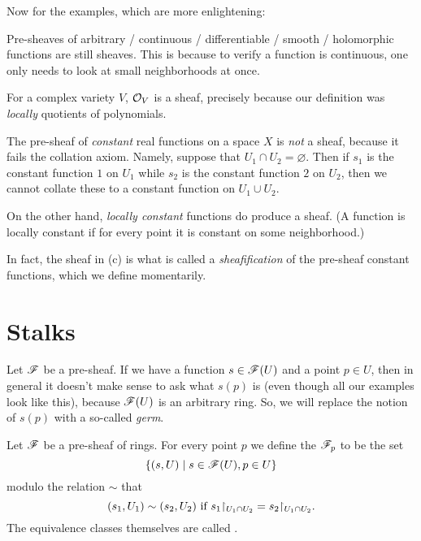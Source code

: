 \documentclass[11pt]{scrreprt}
\begin{document}
Now for the examples, which are more enlightening:
\begin{example}
	\listhack
	\begin{enumerate}[(a)]
		\ii Pre-sheaves of arbitrary / continuous / differentiable / smooth
		/ holomorphic functions are still sheaves.
		This is because to verify a function is continuous,
		one only needs to look at small neighborhoods at once.
		
		\ii For a complex variety $V$, $\mathcal O_V$ is a sheaf,
		precisely because our definition was \emph{locally} quotients
		of polynomials.

		\ii The pre-sheaf of \emph{constant} real functions on a space $X$
		is \emph{not} a sheaf, because it fails the collation axiom.
		Namely, suppose that $U_1 \cap U_2 = \varnothing$.
		Then if $s_1$ is the constant function $1$ on $U_1$
		while $s_2$ is the constant function $2$ on $U_2$,
		then we cannot collate these to a constant function on $U_1 \cup U_2$.

		\ii On the other hand, \emph{locally constant} functions
		do produce a sheaf. (A function is locally constant
		if for every point it is constant on some neighborhood.)
	\end{enumerate}
	In fact, the sheaf in (c) is what is called a \emph{sheafification}
	of the pre-sheaf constant functions, which we define momentarily.
\end{example}

\section{Stalks}
Let $\mathscr F$ be a pre-sheaf.
If we have a function $s \in \mathscr F(U)$ and a point $p \in U$,
then in general it doesn't make sense to ask what $s(p)$ is
(even though all our examples look like this),
because $\mathscr F(U)$ is an arbitrary ring.
So, we will replace the notion of $s(p)$ with a so-called \emph{germ}.

\begin{definition}
	Let $\mathscr F$ be a pre-sheaf of rings.
	For every point $p$ we define the  $\mathscr F_p$ to be the set
	\[ \left\{ (s, U) \mid s \in \mathscr F(U), p \in U \right\} \]
	modulo the relation $\sim$ that 
	\[ (s_1,U_1) \sim (s_2, U_2) \text{ if }
		s_1 \restrict{U_1 \cap U_2} = s_2 \restrict{U_1 \cap U_2}. \]
	The equivalence classes themselves are called .
\end{definition}
\end{document}
